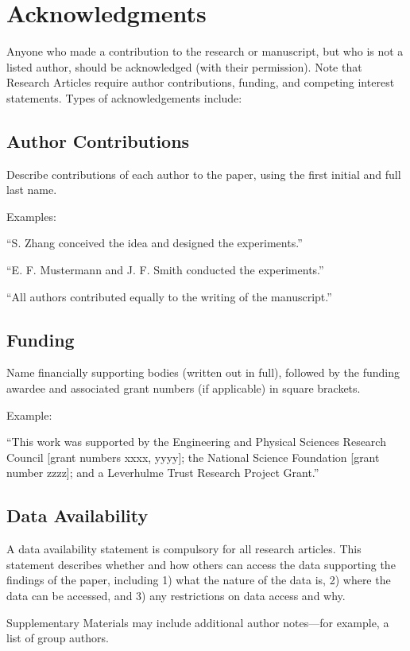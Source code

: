 \documentclass{article}
\begin{document}
\section*{Acknowledgments}
Anyone who made a contribution to the research or manuscript, but who is not a listed author, should be acknowledged (with their permission). Note that Research Articles require author contributions, funding, and competing interest statements. Types of acknowledgements include:

\subsection*{Author Contributions}
Describe contributions of each author to the paper, using the first initial and full last name.

\medskip Examples:

``S. Zhang conceived the idea and designed the experiments.''

``E. F. Mustermann and J. F. Smith conducted the experiments.''

``All authors contributed equally to the writing of the manuscript.''

\subsection*{Funding}
Name financially supporting bodies (written out in full), followed by the funding awardee and associated grant numbers (if applicable) in square brackets.

\medskip Example:

``This work was supported by the Engineering and Physical Sciences Research Council [grant numbers xxxx, yyyy]; the National Science Foundation [grant number zzzz]; and a Leverhulme Trust Research Project Grant.''

\subsection*{Data Availability}
A data availability statement is compulsory for all research articles. This statement describes whether and how others can access the data supporting the findings of the paper, including 1) what the nature of the data is, 2) where the data can be accessed, and 3) any restrictions on data access and why.

\printbibliography

\begin{appendices}

\end{appendices}
Supplementary Materials may include additional author notes—for example, a list of group authors.
\end{document}
